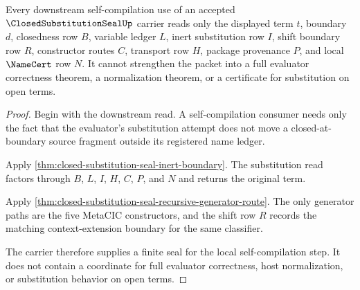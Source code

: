 \begin{theorem}
\label{thm:closed-substitution-seal-ledger-exhaustion}
Every downstream self-compilation use of an accepted $\ClosedSubstitutionSealUp$ carrier reads only the displayed term $t$, boundary $d$, closedness row $B$, variable ledger $L$, inert substitution row $I$, shift boundary row $R$, constructor routes $C$, transport row $H$, package provenance $P$, and local $\NameCert$ row $N$. It cannot strengthen the packet into a full evaluator correctness theorem, a normalization theorem, or a certificate for substitution on open terms.
\end{theorem}
\begin{proof}
Begin with the downstream read. A self-compilation consumer needs only the fact that the evaluator's substitution attempt does not move a closed-at-boundary source fragment outside its registered name ledger.

Apply \autoref{thm:closed-substitution-seal-inert-boundary}. The substitution read factors through $B$, $L$, $I$, $H$, $C$, $P$, and $N$ and returns the original term.

Apply \autoref{thm:closed-substitution-seal-recursive-generator-route}. The only generator paths are the five MetaCIC constructors, and the shift row $R$ records the matching context-extension boundary for the same classifier.

The carrier therefore supplies a finite seal for the local self-compilation step. It does not contain a coordinate for full evaluator correctness, host normalization, or substitution behavior on open terms.
\end{proof}


\begin{closurestatus}{\ClosedSubstitutionSealUp}
  \theoryclosure{\obligationClosure}
  \formalstatus{\unformalizedV}
\end{closurestatus}
